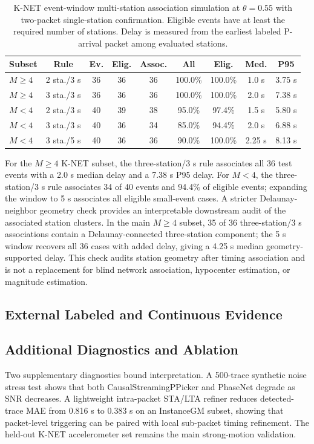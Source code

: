 \documentclass[journal]{IEEEtran}
\newcommand{\modelv}{CausalStreamingPPicker\xspace}
\begin{document}
\begin{table}[!t]
\centering
\caption{K-NET event-window multi-station association simulation at $\theta=0.55$ with two-packet single-station confirmation. Eligible events have at least the required number of stations. Delay is measured from the earliest labeled P-arrival packet among evaluated stations.}
\label{tab:association}
{\scriptsize\setlength{\tabcolsep}{1.45pt}\renewcommand{\arraystretch}{1.03}
\begin{tabular}{@{}lcccccccc@{}}
\toprule
Subset & Rule & Ev. & Elig. & Assoc. & All & Elig. & Med. & P95\\
\midrule
$M\geq4$ & 2 sta./3 s & 36 & 36 & 36 & 100.0\% & 100.0\% & 1.0 s & 3.75 s\\
$M\geq4$ & 3 sta./3 s & 36 & 36 & 36 & 100.0\% & 100.0\% & 2.0 s & 7.38 s\\
$M<4$ & 2 sta./3 s & 40 & 39 & 38 & 95.0\% & 97.4\% & 1.5 s & 5.80 s\\
$M<4$ & 3 sta./3 s & 40 & 36 & 34 & 85.0\% & 94.4\% & 2.0 s & 6.88 s\\
$M<4$ & 3 sta./5 s & 40 & 36 & 36 & 90.0\% & 100.0\% & 2.25 s & 8.13 s\\
\bottomrule
\end{tabular}}
\end{table}

For the $M\geq4$ K-NET subset, the three-station/3 s rule associates all 36 test events with a 2.0 s median delay and a 7.38 s P95 delay. For $M<4$, the three-station/3 s rule associates 34 of 40 events and 94.4\% of eligible events; expanding the window to 5 s associates all eligible small-event cases. A stricter Delaunay-neighbor geometry check provides an interpretable downstream audit of the associated station clusters. In the main $M\geq4$ subset, 35 of 36 three-station/3 s associations contain a Delaunay-connected three-station component; the 5 s window recovers all 36 cases with added delay, giving a 4.25 s median geometry-supported delay. This check audits station geometry after timing association and is not a replacement for blind network association, hypocenter estimation, or magnitude estimation.

\FloatBarrier
\subsection{External Labeled and Continuous Evidence}

\FloatBarrier

\subsection{Additional Diagnostics and Ablation}
Two supplementary diagnostics bound interpretation. A 500-trace synthetic noise stress test shows that both \modelv{} and PhaseNet degrade as SNR decreases. A lightweight intra-packet STA/LTA refiner reduces detected-trace MAE from 0.816 s to 0.383 s on an InstanceGM subset, showing that packet-level triggering can be paired with local sub-packet timing refinement. The held-out K-NET accelerometer set remains the main strong-motion validation.
\end{document}
